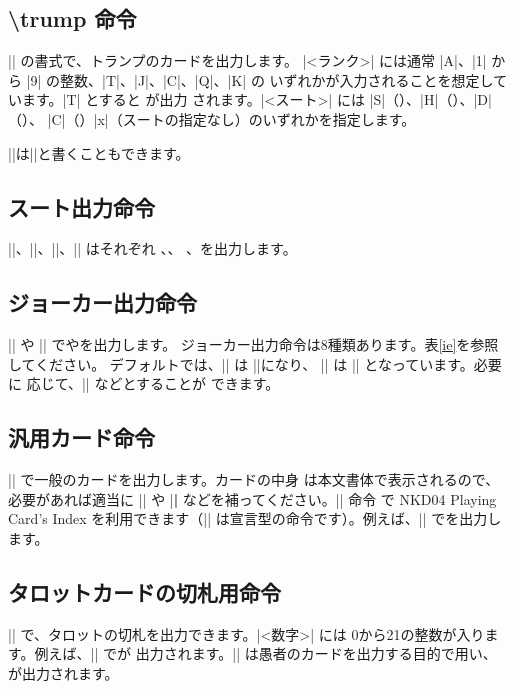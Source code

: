 \documentclass{jlreq}
\begin{document}
\subsection{\textbackslash trump 命令}
|| の書式で、トランプのカードを出力します。
|<ランク>| には通常 |A|、|1| から |9| の整数、|T|、|J|、|C|、|Q|、|K| の
いずれかが入力されることを想定しています。|T| とすると
{}が出力
されます。|<スート>| には |S|（\hmS）、|H|（\hmH）、|D|（\hmD）、
|C|（\hmC）|x|（スートの指定なし）のいずれかを指定します。

||は||と書くこともできます。

\subsection{スート出力命令}
|\hmS|、|\hmH|、|\hmD|、|\hmC| はそれぞれ \hmS、\hmH、
\hmD、\hmC を出力します。

\subsection{ジョーカー出力命令}
|\JOKER| や |\joker| で\JOKER や\joker を出力します。
ジョーカー出力命令は8種類あります。表\ref{ie}を参照してください。
デフォルトでは、|\JOKER| は |\BLACKJOKER|になり、
|\joker| は |\blackjoker| となっています。必要に
応じて、|\renewcommand{\joker}{\whitejoker}| などとすることが
できます。

\subsection{汎用カード命令}
|| で一般のカードを出力します。カードの中身
は本文書体で表示されるので、必要があれば適当に |\textsf| や |\textbf|
などを補ってください。|\hmtcfont| 命令
で NKD04 Playing Card's Index を利用できます（|\hmtcfont|
は宣言型の命令です）。例えば、||
でを出力します。

\subsection{タロットカードの切札用命令}
|| で、タロットの切札を出力できます。|<数字>| には
0から21の整数が入ります。例えば、|| でが
出力されます。|| は愚者のカードを出力する目的で用い、
が出力されます。
\end{document}
